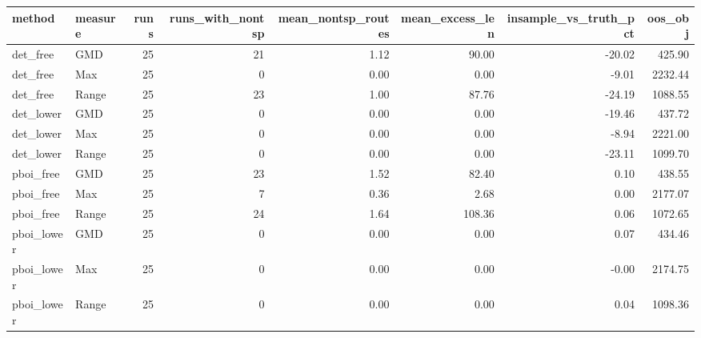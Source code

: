 \begin{tabular}{llrrrrrr}
\toprule
method & measure & runs & runs_with_nontsp & mean_nontsp_routes & mean_excess_len & insample_vs_truth_pct & oos_obj \\
\midrule
det_free & GMD & 25 & 21 & 1.12 & 90.00 & -20.02 & 425.90 \\
det_free & Max & 25 & 0 & 0.00 & 0.00 & -9.01 & 2232.44 \\
det_free & Range & 25 & 23 & 1.00 & 87.76 & -24.19 & 1088.55 \\
det_lower & GMD & 25 & 0 & 0.00 & 0.00 & -19.46 & 437.72 \\
det_lower & Max & 25 & 0 & 0.00 & 0.00 & -8.94 & 2221.00 \\
det_lower & Range & 25 & 0 & 0.00 & 0.00 & -23.11 & 1099.70 \\
pboi_free & GMD & 25 & 23 & 1.52 & 82.40 & 0.10 & 438.55 \\
pboi_free & Max & 25 & 7 & 0.36 & 2.68 & 0.00 & 2177.07 \\
pboi_free & Range & 25 & 24 & 1.64 & 108.36 & 0.06 & 1072.65 \\
pboi_lower & GMD & 25 & 0 & 0.00 & 0.00 & 0.07 & 434.46 \\
pboi_lower & Max & 25 & 0 & 0.00 & 0.00 & -0.00 & 2174.75 \\
pboi_lower & Range & 25 & 0 & 0.00 & 0.00 & 0.04 & 1098.36 \\
\bottomrule
\end{tabular}
